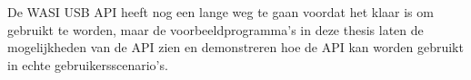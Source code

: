 De \acrshort{WASI} \acrshort{USB} \acrshort{API} heeft nog een lange weg te gaan voordat het klaar is om gebruikt te worden, maar de voorbeeldprogramma’s in deze thesis laten de mogelijkheden van de \acrshort{API} zien en demonstreren hoe de \acrshort{API} kan worden gebruikt in echte gebruikersscenario's.
\restoregeometry